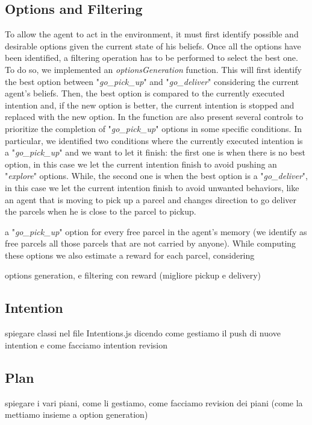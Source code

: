     \subsection{Options and Filtering}
        To allow the agent to act in the environment, it must first identify possible and desirable options given the current state of his beliefs. Once all the options have been identified, a filtering operation has to be performed to select the best one.
        \medskip\\
        To do so, we implemented an \textit{optionsGeneration} function. This will first identify the best option between "\textit{go\_pick\_up}" and "\textit{go\_deliver}" considering the current agent's beliefs. Then, the best option is compared to the currently executed intention and, if the new option is better, the current intention is stopped and replaced with the new option. In the function are also present several controls to prioritize the completion of "\textit{go\_pick\_up}" options in some specific conditions. In particular, we identified two conditions where the currently executed intention is a "\textit{go\_pick\_up}" and we want to let it finish: the first one is when there is no best option, in this case we let the current intention finish to avoid pushing an "\textit{explore}" options. While, the second one is when the best option is a "\textit{go\_deliver}", in this case we let the current intention finish to avoid unwanted behaviors, like an agent that is moving to pick up a parcel and changes direction to go deliver the parcels when he is close to the parcel to pickup.
        
        a "\textit{go\_pick\_up}" option for every free parcel in the agent's memory (we identify as free parcels all those parcels that are not carried by anyone). While computing these options we also estimate a reward for each parcel, considering 

        options generation, e filtering con reward (migliore pickup e delivery)

    \subsection{Intention}
        spiegare classi nel file Intentions.js dicendo come gestiamo il push di nuove intention e come facciamo intention revision

    \subsection{Plan}
        spiegare i vari piani, come li gestiamo, come facciamo revision dei piani (come la mettiamo insieme a option generation)

